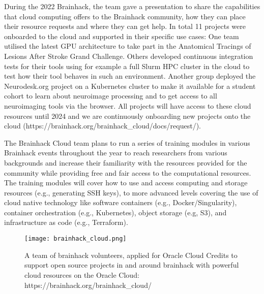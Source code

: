 \documentclass[../main.tex]{subfiles}
\begin{document}
During the 2022 Brainhack, the team gave a presentation to share the capabilities that cloud computing offers to the Brainhack community, how they can place their resource requests and where they can get help. In total 11 projects were onboarded to the cloud and supported in their specific use cases: One team utilised the latest GPU architecture to take part in the Anatomical Tracings of Lesions After Stroke Grand Challenge. Others developed continuous integration tests for their tools using for example a full Slurm HPC cluster in the cloud to test how their tool behaves in such an environment. Another group deployed the Neurodesk.org \parencite{NeuroDesk} project on a Kubernetes cluster to make it available for a student cohort to learn about neuroimage processing and to get access to all neuroimaging tools via the browser. All projects will have access to these cloud resources until 2024 and we are continuously onboarding new projects onto the cloud (https://brainhack.org/brainhack\_cloud/docs/request/).

The Brainhack Cloud team plans to run a series of training modules in various Brainhack events throughout the year to reach researchers from various backgrounds and increase their familiarity with the resources provided for the community while providing free and fair access to the computational resources. The training modules will cover how to use and access computing and storage resources (e.g., generating SSH keys), to more advanced levels covering the use of cloud native technology like software containers (e.g., Docker/Singularity), container orchestration (e.g., Kubernetes), object storage (e.g, S3), and infrastructure as code (e.g., Terraform).

\begin{figure}
    \centering
    \texttt{[image: brainhack\_cloud.png]}
    \caption{A team of brainhack volunteers, applied for Oracle Cloud Credits to support open source projects in and around brainhack with powerful cloud resources on the Oracle Cloud: https://brainhack.org/brainhack\_cloud/
    }
    \label{fig:cloud}
\end{figure}




\printbibliography
\end{document}
